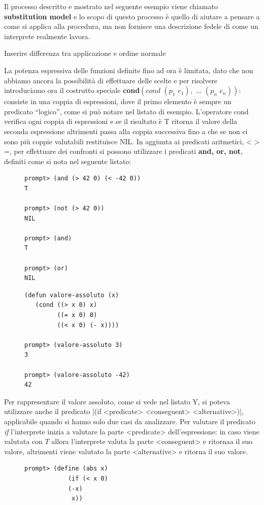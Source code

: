 \documentclass[a4paper]{book}
\begin{document}
Il processo descritto e mostrato nel seguente esempio viene chiamato \textbf{substitution model} e lo scopo di questo processo è quello
di aiutare a pensare a come si applica alla procedura, ma non fornisce una descrizione fedele di come un interprete realmente lavora.

Inserire differenza tra applicazione e ordine normale


La potenza espressiva delle funzioni definite fino ad ora è limitata, dato che non abbiamo ancora la possibilità di effettuare delle scelte
e per risolvere introduciamo ora il costrutto speciale \textbf{cond}$(cond\,\,(p_1\,\,e_1),\,\,...\,\,(p_n\,\,e_n))$:
consiste in una coppia di espressioni, dove il primo elemento è sempre un predicato ``logico'', come si può notare nel listato di esempio.\newline
L'operatore cond verifica ogni coppia di espressioni e se il risultato è T ritorna il valore della seconda espressione altrimenti
passa alla coppia successiva fino a che se non ci sono più coppie valutabili restituisce NIL.\newline
In aggiunta ai predicati aritmetici, < > =, per effettuare dei confronti si possono utilizzare i predicati \textbf{and, or, not},
definiti come si nota nel seguente listato:
\begin{figure}
\begin{verbatim}
prompt> (and (> 42 0) (< -42 0))
T

prompt> (not (> 42 0))
NIL

prompt> (and)
T

prompt> (or)
NIL
\end{verbatim}
\end{figure}

\begin{figure}
\begin{verbatim}
(defun valore-assoluto (x)
   (cond ((> x 0) x)
         ((= x 0) 0)
         ((< x 0) (- x))))

prompt> (valore-assoluto 3)
3

prompt> (valore-assoluto -42)
42
\end{verbatim}
\end{figure}
Per rappresentare il valore assoluto, come si vede nel listato Y, si poteva utilizzare anche il predicato 
|(if <predicate> <conseguent> <alternative>)|, applicabile quando si hanno solo due casi da analizzare.\newline
Per valutare il predicato \emph{if} l'interprete inizia a valutare la parte <predicate> dell'espressione: in caso viene valutata con $T$
allora l'interprete valuta la parte <conseguent> e ritornaa il suo valore, altrimenti viene valutato la parte <alternative> e ritorna il suo valore.

\begin{figure}
\begin{verbatim}
prompt> (define (abs x)
            (if (< x 0)
            (-x)
             x))
\end{verbatim}
\end{figure}
\end{document}
